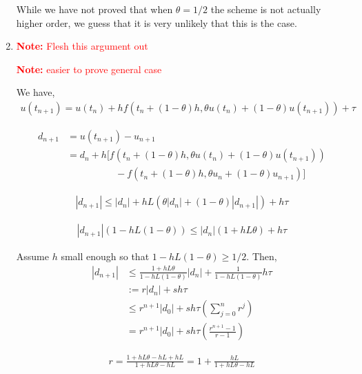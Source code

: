 \documentclass[10pt]{article}
\newcommand{\note}[1]{\textcolor{red}{\textbf{Note:} #1}}
\begin{document}
\begin{solution}[Solution]
\begin{enumerate}[label=(\alph*)]
        While we have not proved that when \( \theta=1/2 \) the scheme is not actually higher order, we guess that it is very unlikely that this is the case.

    \item 
        \note{Flesh this argument out}

        \note{easier to prove general case}

        We have,
        \begin{align*}
            u(t_{n+1}) = u(t_n) + h f(t_n+(1-\theta)h, \theta u(t_n) + (1-\theta)u(t_{n+1})) + \tau
        \end{align*}
        

        \begin{align*}
            d_{n+1} &= u(t_{n+1})-u_{n+1}
            \\&= d_n + h [ 
            f(t_n+(1-\theta)h,\theta u(t_n)+(1-\theta)u(t_{n+1}))
            \\&\hspace{5em}-f(t_n+(1-\theta)h,\theta u_n+(1-\theta)u_{n+1})
            ]
        \end{align*}
        

        \begin{align*}
            |d_{n+1}| \leq |d_n| + h L(\theta |d_n| + (1-\theta)|d_{n+1}|) + h\tau
        \end{align*}
        

        \begin{align*}
            |d_{n+1}|(1-hL(1-\theta)) \leq |d_n|(1+hL\theta) + h\tau
        \end{align*}
        
        Assume \( h \) small enough so that \( 1-hL(1-\theta) \geq 1/2 \). Then,
        \begin{align*}
            |d_{n+1}| &\leq \frac{1+hL\theta}{1-hL(1-\theta)}|d_n| + \frac{1}{1-hL(1-\theta)} h \tau
            \\&:= r|d_n| + s h \tau
            \\ &\leq r^{n+1}|d_0| + s h \tau \left( \sum_{j=0}^{n} r^j \right)
            \\ &= r^{n+1}|d_0| + sh \tau \left( \frac{r^{n+1}-1}{r-1} \right)
        \end{align*}
        
        \begin{align*}
            r = \frac{1+hL\theta - hL + hL}{1+hL\theta - hL}
            = 1 + \frac{hL}{1+hL\theta - hL}
        \end{align*}
        

\end{enumerate}
\end{solution}
\end{document}
